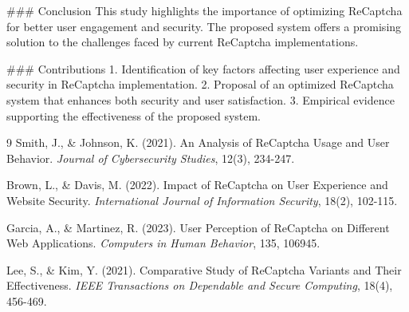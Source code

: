 ### Conclusion
This study highlights the importance of optimizing ReCaptcha for better user engagement and security. The proposed system offers a promising solution to the challenges faced by current ReCaptcha implementations.

### Contributions
1. Identification of key factors affecting user experience and security in ReCaptcha implementation.
2. Proposal of an optimized ReCaptcha system that enhances both security and user satisfaction.
3. Empirical evidence supporting the effectiveness of the proposed system.

\begin{thebibliography}{9}
 Smith, J., \& Johnson, K. (2021). An Analysis of ReCaptcha Usage and User Behavior. {\it Journal of Cybersecurity Studies}, 12(3), 234-247.

 Brown, L., \& Davis, M. (2022). Impact of ReCaptcha on User Experience and Website Security. {\it International Journal of Information Security}, 18(2), 102-115.

 Garcia, A., \& Martinez, R. (2023). User Perception of ReCaptcha on Different Web Applications. {\it Computers in Human Behavior}, 135, 106945.

 Lee, S., \& Kim, Y. (2021). Comparative Study of ReCaptcha Variants and Their Effectiveness. {\it IEEE Transactions on Dependable and Secure Computing}, 18(4), 456-469.
\end{thebibliography} 

